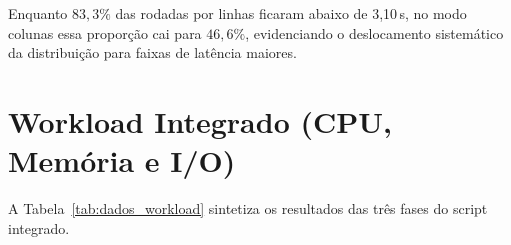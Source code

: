\documentclass[
	12pt,
	openright,
	oneside,
	a4paper,
	english,
	brazil
	]{abntex2}
\begin{document}
\begin{table}[htb]
\centering
\caption{Distribuição de frequência dos tempos no teste de localidade}
\label{tab:frequencia_localidade}
\small
{}
\end{table}

Enquanto $83{,}3\%$ das rodadas por linhas ficaram abaixo de 3,10\,s, no modo colunas essa proporção cai para $46{,}6\%$, evidenciando o deslocamento sistemático da distribuição para faixas de latência maiores.

\section{Workload Integrado (CPU, Memória e I/O)}
\label{sec:resultados_workload}

A Tabela~\ref{tab:dados_workload} sintetiza os resultados das três fases do script integrado.

\begin{table}[htb]
\centering
\caption{Resultados estatísticos das fases do workload integrado ($N = 30$)}
\label{tab:dados_workload}
\small
{}
\end{table}
\end{document}
